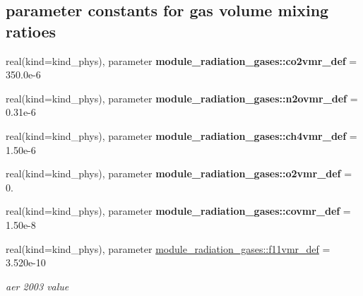\subsection*{parameter constants for gas volume mixing ratioes}
\begin{DoxyCompactItemize}
\item 
\mbox{\label{group__module__radiation__gases_ga4fb5ca2e3bfaed7848d7602a22499e76}} 
real(kind=kind\+\_\+phys), parameter {\bfseries module\+\_\+radiation\+\_\+gases\+::co2vmr\+\_\+def} = 350.\+0e-\/6
\item 
\mbox{\label{group__module__radiation__gases_ga858ad802efe755f8b4b5bde85996b6ae}} 
real(kind=kind\+\_\+phys), parameter {\bfseries module\+\_\+radiation\+\_\+gases\+::n2ovmr\+\_\+def} = 0.\+31e-\/6
\item 
\mbox{\label{group__module__radiation__gases_gaad928d9e0064905a0b6e1eb8bb59bd23}} 
real(kind=kind\+\_\+phys), parameter {\bfseries module\+\_\+radiation\+\_\+gases\+::ch4vmr\+\_\+def} = 1.\+50e-\/6
\item 
\mbox{\label{group__module__radiation__gases_ga910898e96b8afe92ebc82ce62ba682d8}} 
real(kind=kind\+\_\+phys), parameter {\bfseries module\+\_\+radiation\+\_\+gases\+::o2vmr\+\_\+def} = 0.
\item 
\mbox{\label{group__module__radiation__gases_ga3554bdf03f8222d425bb6c946244cbb5}} 
real(kind=kind\+\_\+phys), parameter {\bfseries module\+\_\+radiation\+\_\+gases\+::covmr\+\_\+def} = 1.\+50e-\/8
\item 
\mbox{\label{group__module__radiation__gases_ga23ae6bb6860bfefef0c281b7106f521e}} 
real(kind=kind\+\_\+phys), parameter \hyperlink{group__module__radiation__gases_ga23ae6bb6860bfefef0c281b7106f521e}{module\+\_\+radiation\+\_\+gases\+::f11vmr\+\_\+def} = 3.\+520e-\/10
\begin{DoxyCompactList}\small\item\em aer 2003 value \end{DoxyCompactList}\item 
\mbox{\label{group__module__radiation__gases_ga96d4f78070f30010626e0824b3421250}} 

\end{DoxyCompactItemize}
